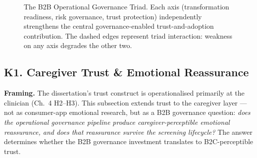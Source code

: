 \begin{figure}[!htbp]
\centering
{}
\caption[The B2B Operational Governance Triad]{The B2B Operational Governance Triad. Each axis (transformation readiness, risk governance, trust protection) independently strengthens the central governance-enabled trust-and-adoption contribution. The dashed edges represent triad interaction: weakness on any axis degrades the other two.}
\label{fig:appk_triad}
\end{figure}

\subsection*{K1. Caregiver Trust \& Emotional Reassurance}
\label{sec:appk_caregiver_trust}

\noindent\textbf{Framing.} The dissertation's trust construct is operationalised primarily at the clinician (Ch.~4 H2--H3). This subsection extends trust to the caregiver layer --- not as consumer-app emotional research, but as a B2B governance question: \emph{does the operational governance pipeline produce caregiver-perceptible emotional reassurance, and does that reassurance survive the screening lifecycle?} The answer determines whether the B2B governance investment translates to B2C-perceptible trust.

